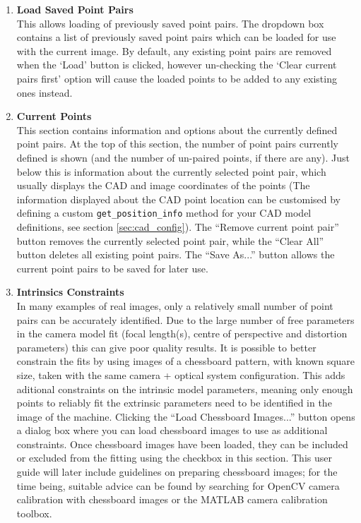 \documentclass[12pt]{article}
\newcommand{\code}[1]{\texttt{#1}}
\begin{document}
\begin{enumerate}
\item{\textbf{Load Saved Point Pairs}\\This allows loading of previously saved point pairs. The dropdown box contains a list of previously saved point pairs which can be loaded for use with the current image. By default, any existing point pairs are removed when the `Load' button is clicked, however un-checking the `Clear current pairs first' option will cause the loaded points to be added to any existing ones instead.}
\item{\textbf{Current Points}\\This section contains information and options about the currently defined point pairs. At the top of this section, the number of point pairs currently defined is shown (and the number of un-paired points, if there are any). Just below this is information about the currently selected point pair, which usually displays the CAD and image coordinates of the points (The information displayed about the CAD point location can be customised by defining a custom \code{get\_position\_info} method for your CAD model definitions, see section \ref{sec:cad_config}). The ``Remove current point pair'' button removes the currently selected point pair, while the ``Clear All'' button deletes all existing point pairs. The ``Save As...'' button allows the current point pairs to be saved for later use.}
\item{\textbf{Intrinsics Constraints}\\In many examples of real images, only a relatively small number of point pairs can be accurately identified. Due to the large number of free parameters in the camera model fit (focal length(s), centre of perspective and distortion parameters) this can give poor quality results. It is possible to better constrain the fits by using images of a chessboard pattern, with known square size, taken with the same camera + optical system configuration. This adds aditional constraints on the intrinsic model parameters, meaning only enough points to reliably fit the extrinsic parameters need to be identified in the image of the machine. Clicking the ``Load Chessboard Images...'' button opens a dialog box where you can load chessboard images to use as additional constraints. Once chessboard images have been loaded, they can be included or excluded from the fitting using the checkbox in this section. This user guide will later include guidelines on preparing chessboard images; for the time being, suitable advice can be found by searching for OpenCV camera calibration with chessboard images or the MATLAB camera calibration toolbox.}
\end{enumerate}
\end{document}
